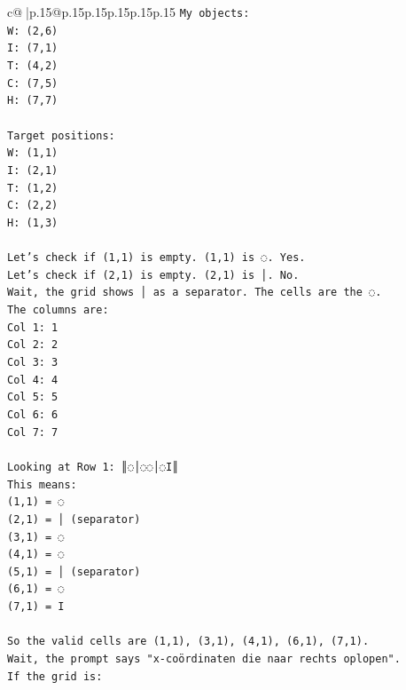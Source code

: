 \documentclass{article}
\begin{document}
{\begin{supertabular}{c@{$\;$}|p{.15\linewidth}@{}p{.15\linewidth}p{.15\linewidth}p{.15\linewidth}p{.15\linewidth}p{.15\linewidth}}
{{{\texttt{My objects:} \\
\texttt{W: (2,6)} \\
\texttt{I: (7,1)} \\
\texttt{T: (4,2)} \\
\texttt{C: (7,5)} \\
\texttt{H: (7,7)} \\
\\ 
\texttt{Target positions:} \\
\texttt{W: (1,1)} \\
\texttt{I: (2,1)} \\
\texttt{T: (1,2)} \\
\texttt{C: (2,2)} \\
\texttt{H: (1,3)} \\
\\ 
\texttt{Let's check if (1,1) is empty. (1,1) is ◌. Yes.} \\
\texttt{Let's check if (2,1) is empty. (2,1) is │. No.} \\
\texttt{Wait, the grid shows │ as a separator. The cells are the ◌.} \\
\texttt{The columns are:} \\
\texttt{Col 1: 1} \\
\texttt{Col 2: 2} \\
\texttt{Col 3: 3} \\
\texttt{Col 4: 4} \\
\texttt{Col 5: 5} \\
\texttt{Col 6: 6} \\
\texttt{Col 7: 7} \\
\\ 
\texttt{Looking at Row 1: ║◌│◌◌│◌I║} \\
\texttt{This means:} \\
\texttt{(1,1) = ◌} \\
\texttt{(2,1) = │ (separator)} \\
\texttt{(3,1) = ◌} \\
\texttt{(4,1) = ◌} \\
\texttt{(5,1) = │ (separator)} \\
\texttt{(6,1) = ◌} \\
\texttt{(7,1) = I} \\
\\ 
\texttt{So the valid cells are (1,1), (3,1), (4,1), (6,1), (7,1).} \\
\texttt{Wait, the prompt says "x{-}coördinaten die naar rechts oplopen".} \\
\texttt{If the grid is:} \\
}}}
\end{supertabular}}
\end{document}
